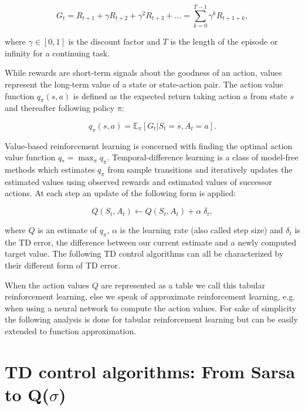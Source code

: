 \documentclass{article} %
\begin{document}
\begin{equation} 
G_t = R_{t+1} + \gamma R_{t+2} + \gamma^2 R_{t+3} + ... = \sum_{k=0}^{T-1} \gamma^k R_{t+1+k},
\end{equation}

where $\gamma \in [0, 1]$ is the discount factor and $T$ is the length of the episode or infinity for a continuing task.

While rewards are short-term signals about the goodness of an action, values represent the long-term value of a state or state-action pair. The action value function $q_\pi(s, a)$ is defined as the expected return taking action $a$ from state $s$ and thereafter following policy $\pi$:

\begin{equation} 
q_\pi(s, a) = \mathbb{E}_\pi[G_t | S_t = s, A_t = a].
\label{actionvalue}
\end{equation}

Value-based reinforcement learning is concerned with finding the optimal action value function $q_* = \max_\pi q_\pi$. Temporal-difference learning is a class of model-free methods which estimates $q_\pi$ from sample transitions and iteratively updates the estimated values using observed rewards and estimated values of successor actions. At each step an update of the following form is applied:

\begin{equation} 
Q(S_t, A_t) \leftarrow Q(S_t, A_t) + \alpha \; \delta_t,
\label{equ:update}
\end{equation}

where $Q$ is an estimate of $q_\pi$, $\alpha$ is the learning rate (also called step size) and $\delta_t$ is the TD error, the difference between our current estimate and a newly computed target value. The following TD control algorithms can all be characterized by their different form of TD error.

When the action values $Q$ are represented as a table we call this tabular reinforcement learning, else we speak of approximate reinforcement learning, e.g. when using a neural network to compute the action values. For sake of simplicity the following analysis is done for tabular reinforcement learning but can be easily extended to function approximation.

\section[TD control algorithms]{TD control algorithms: From Sarsa to Q($\sigma$)}
\end{document}
